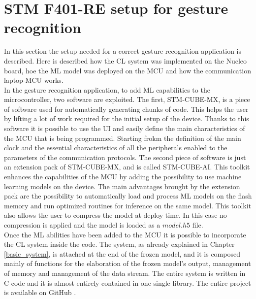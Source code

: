 \documentclass[12pt]{report}
\begin{document}
\section{STM F401-RE setup for gesture recognition}
In this section the setup needed for a correct gesture recognition application is described. Here is described how the CL system was implemented on the Nucleo board, hoe the ML model was deployed on the MCU and how the communication laptop-MCU works.\\
In the gesture recognition application, to add ML capabilities to the microcontroller, two software are exploited. The first, STM-CUBE-MX, is a piece of software used for automatically generating chunks of code. This helps the user by lifting a lot of work required for the initial setup of the device. Thanks to this software it is possible to use the UI and easily define the main characteristics of the MCU that is being programmed. Starting frokm the definition of the main clock and the essential characteristics of all the peripherals enabled to the parameters of the communication protocols. The second piece of software is just an extension pack of STM-CUBE-MX, and is called STM-CUBE-AI. This toolkit enhances the capabilities of the MCU by adding the possibility to use machine learning models on the device. The main advantages brought by the extension pack are the possibility to automatically load and process ML models on the flash memory and run optimized routines for inference on the same model. This toolkit also allows the user to compress the model at deploy time. In this case no compression is applied and the model is loaded as a $model.h5$ file.\\
Once the ML abilities have been added to the MCU it is possible to incorporate the CL system inside the code. The system, as already explained in Chapter \ref{basic_system}, is attached at the end of the frozen model, and it is composed mainly of functions for the elaboration of the frozen model's output, management of memory and management of the data stream. The entire system is written in C code and it is almost entirely contained in one single library. The entire project is available on GitHub \autocite{github_repo}.\\
\end{document}
